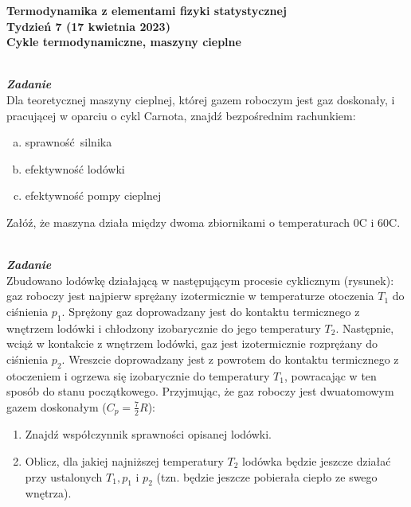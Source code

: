 \documentclass[11pt,a4paper]{article}
\newcounter{zadanie}\newcommand{\zadanie}[1][]{\addtocounter{zadanie}{1} ~\\  {\bf \emph{Zadanie \arabic{zadanie} #1 }} \\}
\begin{document}

\begin{centering}
\bf{\Large{Termodynamika z elementami fizyki statystycznej}}\\
Tydzień 7 (17 kwietnia 2023)\\[3mm]
Cykle termodynamiczne, maszyny cieplne\\
\end{centering} 
\vspace{5mm}

\zadanie
Dla teoretycznej maszyny cieplnej, której gazem roboczym jest gaz doskonały, 
i pracującej w oparciu o cykl Carnota, znajdź bezpośrednim rachunkiem:
\begin{enumerate}[a)]
\item sprawność silnika
\item efektywność lodówki
\item efektywność pompy cieplnej
\end{enumerate}
Załóź, że maszyna działa między dwoma zbiornikami o temperaturach 0\degree C i 60\degree C.

\begin{figure}\vspace{0mm}
\end{figure}
\zadanie
Zbudowano lodówkę działającą w następującym procesie cyklicznym (rysunek): gaz roboczy jest najpierw sprężany izotermicznie w temperaturze otoczenia $T_1$ do ciśnienia $p_1$. Sprężony gaz doprowadzany jest do kontaktu termicznego z wnętrzem lodówki i chłodzony izobarycznie do jego temperatury $T_2$. Następnie, wciąż w kontakcie z wnętrzem lodówki, gaz jest izotermicznie rozprężany do ciśnienia $p_2$. Wreszcie doprowadzany jest z powrotem do kontaktu termicznego z otoczeniem i ogrzewa się izobarycznie do temperatury $T_1$, powracając w ten sposób do stanu początkowego.
Przyjmując, że gaz roboczy jest dwuatomowym gazem doskonałym ($C_p=\frac{7}{2}R$):
\begin{enumerate}
\item Znajdź współczynnik sprawności opisanej lodówki.
\item Oblicz, dla jakiej najniższej temperatury $T_2$ lodówka będzie jeszcze działać przy ustalonych $T_1, p_1$ i $p_2$ (tzn. będzie jeszcze pobierała ciepło ze swego wnętrza).
\end{enumerate}
\end{document}
